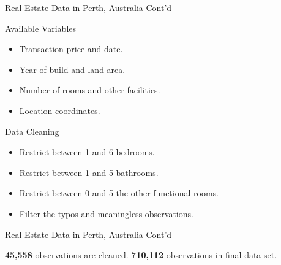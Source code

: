 \documentclass{beamer}
\begin{document}
\begin{frame}[t]{Real Estate Data in Perth, Australia Cont'd}

\begin{block}{Available Variables}
\begin{itemize}
\item Transaction price and date.
\item Year of build and land area. 
\item Number of rooms and other facilities.
\item Location coordinates.
\end{itemize}
\end{block}

\begin{block}{Data Cleaning}
\begin{itemize}
\item Restrict between 1 and 6 bedrooms.
\item Restrict between 1 and 5 bathrooms. 
\item Restrict between 0 and 5 the other functional rooms.
\item Filter the typos and meaningless observations.
\end{itemize}
\end{block}

\end{frame}

\begin{frame}[t]{Real Estate Data in Perth, Australia Cont'd}

\begin{block}{}
\textbf{45,558} observations are cleaned. \textbf{710,112} observations in final data set.
\end{block}

\begin{table}
\caption{The Summary Statistics of Final Dataset}
\vspace*{-\baselineskip}
\end{table}
\end{frame}
\end{document}
